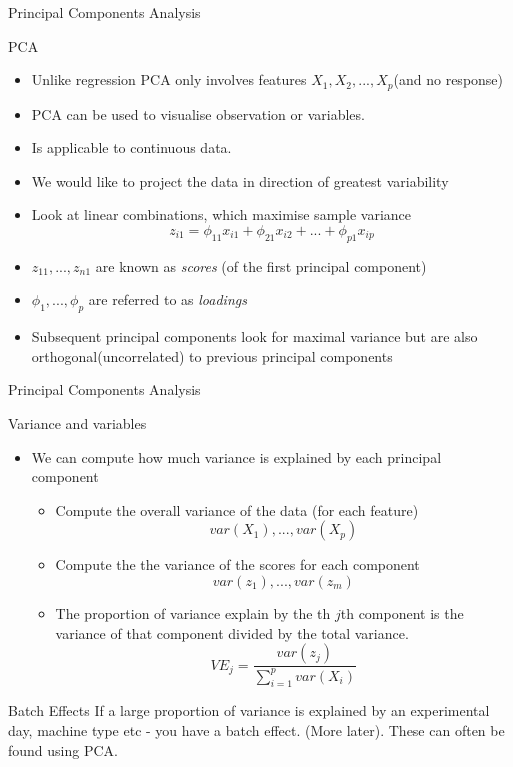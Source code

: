 \documentclass{bredelebeamer}
\begin{document}
\begin{frame}{Principal Components Analysis}
\begin{exampleblock}{PCA}
\begin{itemize}
\item Unlike regression PCA only involves features $X_1,X_2,...,X_p$(and no response)
\item PCA can be used to visualise observation or variables.
\item Is applicable to continuous data.
\item We would like to project the data in direction of greatest variability
\item Look at linear combinations, which maximise sample variance
\begin{equation}
z_{i1} = \phi_{11}x_{i1} + \phi_{21}x_{i2} + ... + \phi_{p1} x_{ip}
\end{equation}
\item $z_{11},...,z_{n1}$ are known as \textit{scores} (of the first principal component)
\item $\phi_1,..., \phi_p$ are referred to as \textit{loadings}
\item Subsequent principal components look for maximal variance but are also orthogonal(uncorrelated) to previous principal components
\end{itemize}
\end{exampleblock}
\end{frame}
\begin{frame}{Principal Components Analysis}
\begin{exampleblock}{Variance and variables}
	\begin{itemize}
	\item We can compute how much variance is explained by each principal component
	\begin{itemize}
	\item Compute the overall variance of the data (for each feature)
	\begin{equation}
	var(X_1),..., var(X_p)
	\end{equation}
	\item Compute the the variance of the scores for each component
	\begin{equation}
	var(z_1),..., var(z_m)
	\end{equation}
	\item The proportion of variance explain by the th $j$th component is the variance of that component divided by the total variance.
	\begin{equation}
	VE_j = \frac{var(z_j)}{\sum_{i =1}^{p} var(X_i)}
	\end{equation}
	\end{itemize}
	\end{itemize}
\end{exampleblock}

\begin{alertblock}{Batch Effects}
If a large proportion of variance is explained by an experimental day, machine type etc - you have a batch effect. (More later). These can often be found using PCA.
\end{alertblock}

\end{frame}
\end{document}
